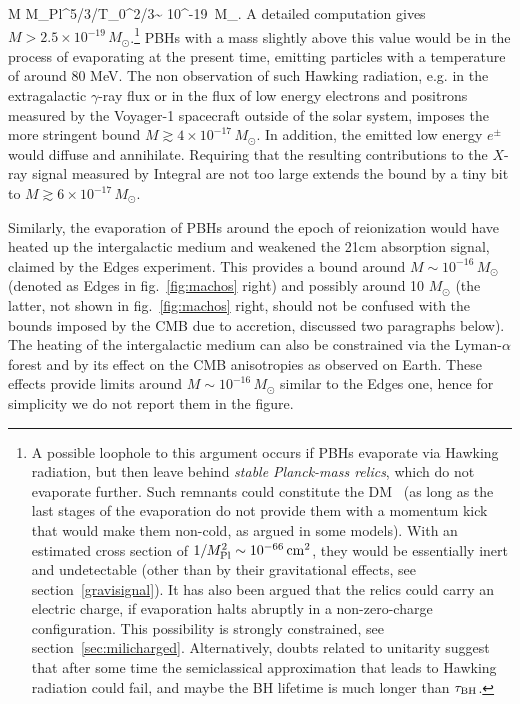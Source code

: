 \beq M \gtrsim M_{\rm Pl}^{5/3}/T_0^{2/3}\sim
10^{-19}\, M_\odot . \eeq
A detailed computation gives $M > 2.5\times 10^{-19}\, M_\odot$.\footnote{
 A possible loophole to this argument occurs if PBHs evaporate via Hawking radiation, 
 but then leave behind {\em stable Planck-mass relics}, 
 which do not evaporate further. Such remnants could constitute the DM~\cite{PlanckRelics} 
 (as long as the last stages of the evaporation do not provide them with a momentum kick that would make them non-cold, as argued in some models). With an estimated cross section of 
 $1/M_{\rm Pl}^2 \sim 10^{-66} \,{\rm cm}^2$, 
 they would be essentially inert and undetectable (other than by their gravitational effects, see section~\ref{gravisignal}). It has also been argued that the relics could carry an electric charge, if evaporation halts abruptly in a non-zero-charge configuration.  
This possibility is strongly constrained, see section~\ref{sec:milicharged}. 
Alternatively, doubts related to unitarity suggest that after some time the semiclassical approximation that leads to
Hawking radiation could fail, and maybe the BH lifetime is much longer than $\tau_{\rm BH}$.}
PBHs with a mass slightly above this value would be in the process of evaporating at the present time, emitting particles with a temperature of around 80 MeV. The non observation of such Hawking radiation, e.g. in the extragalactic $\gamma$-ray flux or in the flux of low energy electrons and positrons measured by the {\sc Voyager-1} spacecraft outside of the solar system, imposes the more stringent bound $M \gtrsim 4\times 10^{-17}\, M_\odot$. 
In addition, the emitted low energy $e^\pm$ would diffuse and annihilate. Requiring that the resulting contributions to the $X$-ray signal measured by {\sc Integral} are not too large extends the bound by a tiny bit to $M \gtrsim 6\times 10^{-17}\, M_\odot$.

Similarly, the evaporation of PBHs around the epoch of reionization would have heated up the intergalactic medium and weakened the 21cm absorption signal, claimed by the {\sc Edges} experiment. 
This provides a bound  around $M \sim 10^{-16}\, M_\odot$ (denoted as {\sc Edges} in fig.~\ref{fig:machos} right) and possibly around 10 $M_\odot$ (the latter, not shown in fig.~\ref{fig:machos} right, should not be confused with the bounds imposed by the CMB due to accretion, discussed two paragraphs below).
The heating of the intergalactic medium can also be constrained via the Lyman-$\alpha$ forest and by its effect on the CMB anisotropies as observed on Earth. These effects provide limits around $M \sim 10^{-16}\, M_\odot$ similar to the {\sc Edges} one, hence for simplicity we do not report them in the figure.


